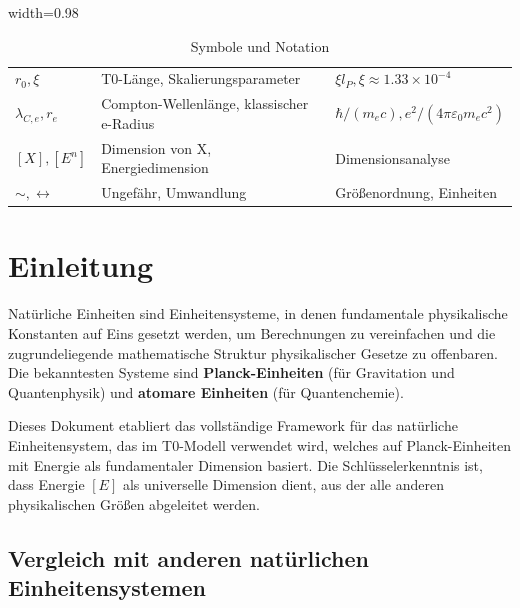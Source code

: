 {\begin{table}[htbp]
\begin{adjustbox}{width=0.98\textwidth}
\begin{tabular}{lll}
					$r_0, \xi$ & T0-Länge, Skalierungsparameter & $\xi l_P, \xi \approx 1.33 \times 10^{-4}$ \\
					$\lambda_{C,e}, r_e$ & Compton-Wellenlänge, klassischer e-Radius & $\hbar/(m_e c), e^2/(4\pi\varepsilon_0 m_e c^2)$ \\
					$[X], [E^n]$ & Dimension von X, Energiedimension & Dimensionsanalyse \\
					$\sim, \leftrightarrow$ & Ungefähr, Umwandlung & Größenordnung, Einheiten \\
					\bottomrule
				\end{tabular}
			\end{adjustbox}
			\caption{Symbole und Notation}
			\label{tab:symbole}
		\end{table}
	}

	\section{Einleitung}
	
	Natürliche Einheiten sind Einheitensysteme, in denen fundamentale physikalische Konstanten auf Eins gesetzt werden, um Berechnungen zu vereinfachen und die zugrundeliegende mathematische Struktur physikalischer Gesetze zu offenbaren. Die bekanntesten Systeme sind \textbf{Planck-Einheiten} (für Gravitation und Quantenphysik) und \textbf{atomare Einheiten} (für Quantenchemie).
	
	Dieses Dokument etabliert das vollständige Framework für das natürliche Einheitensystem, das im T0-Modell verwendet wird, welches auf Planck-Einheiten mit Energie als fundamentaler Dimension basiert. Die Schlüsselerkenntnis ist, dass Energie $[E]$ als universelle Dimension dient, aus der alle anderen physikalischen Größen abgeleitet werden.
	
	\subsection{Vergleich mit anderen natürlichen Einheitensystemen}
	
